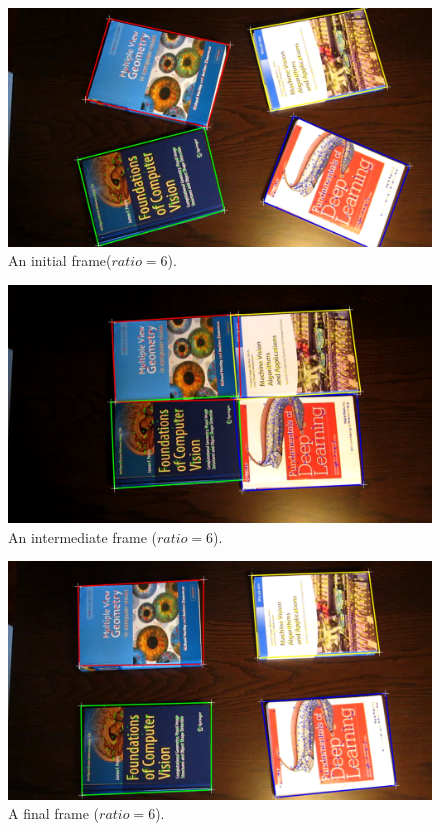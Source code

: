 \documentclass{article}
\begin{document}
\begin{figure}[h]
\centering
\includegraphics[scale=0.2]{Figures/output1}
\caption{An initial frame($ratio = 6$).}\label{matches1}
\end{figure}
\begin{figure}[h]
\centering
\includegraphics[scale=0.2]{Figures/output2}
\caption{An intermediate frame ($ratio = 6$).}\label{matches2}
\end{figure}
\begin{figure}[H]
\centering
\includegraphics[scale=0.2]{Figures/output3}
\caption{A final frame ($ratio = 6$).}\label{matches3}
\end{figure}
\end{document}

